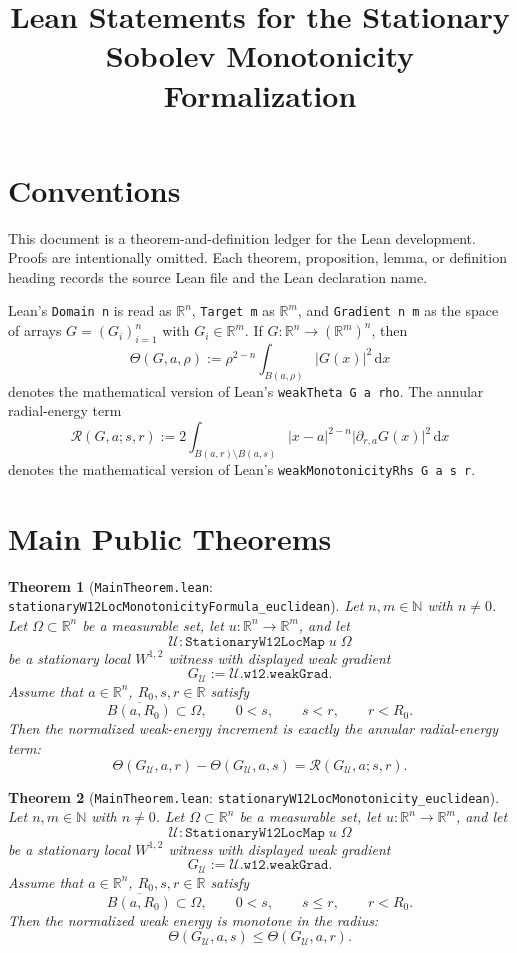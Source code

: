 \documentclass[reqno,11pt]{amsart}
\title[Lean statements for stationary Sobolev monotonicity]{Lean Statements for the Stationary Sobolev Monotonicity Formalization}
\newcommand{\om}{\Omega}
\newcommand{\ud}{\mathrm{d}}
\newcommand{\N}{\mathbb{N}}
\newcommand{\R}{\mathbb{R}}
\newcommand{\ol}{\overline}
\newcommand{\abs}[1]{\lvert#1\rvert}
\numberwithin{equation}{section}
\theoremstyle{plain}
\newtheorem{thm}{Theorem}[section]
\theoremstyle{definition}
\theoremstyle{remark}
\begin{document}
\maketitle
\tableofcontents

\section{Conventions}

This document is a theorem-and-definition ledger for the Lean development.
Proofs are intentionally omitted.  Each theorem, proposition, lemma, or
definition heading records the source Lean file and the Lean declaration name.

Lean's \texttt{Domain n} is read as $\R^n$, \texttt{Target m} as $\R^m$,
and \texttt{Gradient n m} as the space of arrays $G=(G_i)_{i=1}^n$ with
$G_i\in\R^m$.  If $G:\R^n\to(\R^m)^n$, then
\[
  \Theta(G,a,\rho)
  :=
  \rho^{2-n}\int_{B(a,\rho)} \abs{G(x)}^2\,\ud x
\]
denotes the mathematical version of Lean's \texttt{weakTheta G a rho}.
The annular radial-energy term
\[
  \mathcal R(G,a;s,r)
  :=
  2\int_{B(a,r)\setminus B(a,s)}
    \abs{x-a}^{2-n}\abs{\partial_{r,a}G(x)}^2\,\ud x
\]
denotes the mathematical version of Lean's
\texttt{weakMonotonicityRhs G a s r}.

\section{Main Public Theorems}

\begin{thm}[\texttt{MainTheorem.lean}: \texttt{stationaryW12LocMonotonicityFormula\_euclidean}]
\label{thm:stationaryW12LocMonotonicityFormulaEuclidean}
Let $n,m\in\N$ with $n\neq 0$.  Let $\om\subset\R^n$ be a measurable set,
let $u:\R^n\to\R^m$, and let
\[
  \mathcal U : \texttt{StationaryW12LocMap}\; u\; \om
\]
be a stationary local $W^{1,2}$ witness with displayed weak gradient
\[
  G_{\mathcal U}:=\mathcal U.\texttt{w12.weakGrad}.
\]
Assume that $a\in\R^n$, $R_0,s,r\in\R$ satisfy
\[
  \ol{B(a,R_0)}\subset\om,\qquad 0<s,\qquad s<r,\qquad r<R_0.
\]
Then the normalized weak-energy increment is exactly the annular radial-energy
term:
\[
  \Theta(G_{\mathcal U},a,r)-\Theta(G_{\mathcal U},a,s)
  =
  \mathcal R(G_{\mathcal U},a;s,r).
\]
\end{thm}

\begin{thm}[\texttt{MainTheorem.lean}: \texttt{stationaryW12LocMonotonicity\_euclidean}]
\label{thm:stationaryW12LocMonotonicityEuclidean}
Let $n,m\in\N$ with $n\neq 0$.  Let $\om\subset\R^n$ be a measurable set,
let $u:\R^n\to\R^m$, and let
\[
  \mathcal U : \texttt{StationaryW12LocMap}\; u\; \om
\]
be a stationary local $W^{1,2}$ witness with displayed weak gradient
\[
  G_{\mathcal U}:=\mathcal U.\texttt{w12.weakGrad}.
\]
Assume that $a\in\R^n$, $R_0,s,r\in\R$ satisfy
\[
  \ol{B(a,R_0)}\subset\om,\qquad 0<s,\qquad s\le r,\qquad r<R_0.
\]
Then the normalized weak energy is monotone in the radius:
\[
  \Theta(G_{\mathcal U},a,s)
  \le
  \Theta(G_{\mathcal U},a,r).
\]
\end{thm}
\end{document}
